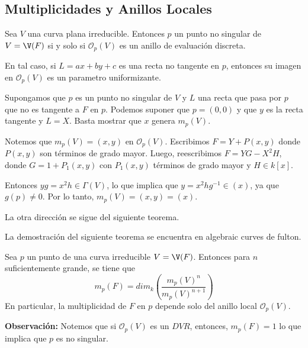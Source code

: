 \documentclass{article}
\begin{document}
\subsection{Multiplicidades y Anillos Locales}
\begin{teo}
    Sea $V$ una curva plana irreducible. Entonces $p$ un punto no singular de $V=\V(F)$ si y solo si
    $\mathcal{O}_{p}(V)$ es un anillo de evaluación discreta.

    \vspace{2mm}
    \noindent En tal caso, si $L=ax+by+c$ es una recta no tangente en $p$, entonces su imagen en
    $\mathcal{O}_{p}(V)$ es un parametro uniformizante.
\end{teo}
\begin{dem}
    Supongamos que $p$ es un punto no singular de $V$ y $L$ una recta que pasa por $p$ que no es
    tangente a $F$ en $p$. Podemos suponer que $p=(0,0)$ y que $y$ es la recta tangente y $L=X$. 
    Basta mostrar que $x$ genera $m_{p}(V)$.

    \vspace{2mm}
    \noindent Notemos que $m_{p}(V)=(x,y)$ en $\mathcal{O}_{p}(V)$. Escribimos $F=Y+P(x,y)$ donde
    $P(x,y)$ son términos de grado mayor. Luego, reescribimos $F=YG-X^{2}H$, donde 
    $G=1+P_{1}(x,y)$ con $P_{1}(x,y)$ términos de grado mayor y $H\in k[x]$.

    \vspace{2mm}
    \noindent Entonces $yg=x^{2}h\in\Gamma(V)$, lo que implica que $y=x^{2}hg^{-1}\in(x)$, ya que
    $g(p)\neq0$. Por lo tanto, $m_{p}(V)=(x,y)=(x)$.

    \vspace{2mm}
    \noindent La otra dirección se sigue del siguiente teorema.
\end{dem}
\noindent La demostración del siguiente teorema se encuentra en algebraic curves de fulton.
\begin{teo}
    Sea $p$ un punto de una curva irreducible $V=\V(F)$. Entonces para $n$ suficientemente grande, 
    se tiene que
    \begin{equation*}
        m_{p}(F)=dim_{k}\left(\frac{m_{p}(V)^{n}}{m_{p}(V)^{n+1}}\right)
    \end{equation*}
    En particular, la multiplicidad de $F$ en $p$ depende solo del anillo local 
    $\mathcal{O}_{p}(V)$.
\end{teo}
\noindent\textbf{Observación:} Notemos que si $\mathcal{O}_{p}(V)$ es un $DVR$, entonces, 
$m_{p}(F)=1$ lo que implica que $p$ es no singular.
\end{document}
